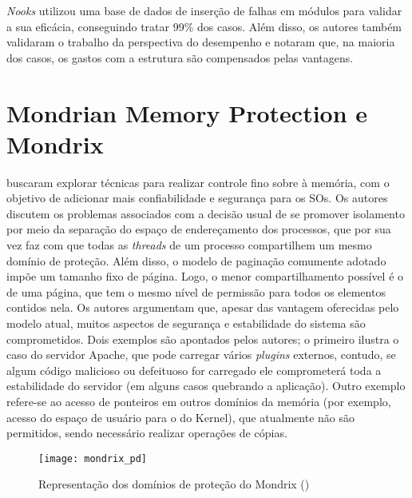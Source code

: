 \emph{Nooks} utilizou uma base de dados de inserção de falhas em módulos para
validar a sua eficácia, conseguindo tratar 99\% dos casos. Além disso, os
autores também validaram o trabalho da perspectiva do desempenho e notaram que,
na maioria dos casos, os gastos com a estrutura são compensados pelas vantagens.

\section{Mondrian Memory Protection e Mondrix}
\label{sec:mondrian}

\citet{mmp} buscaram explorar técnicas para realizar controle fino sobre à
memória, com o objetivo de adicionar mais confiabilidade e segurança para os
SOs. Os autores discutem os problemas associados com a decisão usual de se promover
isolamento por meio da separação do espaço de endereçamento dos processos, que
por sua vez faz com que todas as \emph{threads} de um processo compartilhem um
mesmo domínio de proteção. Além disso, o modelo de paginação comumente adotado impõe um
tamanho fixo de página. Logo, o menor compartilhamento possível é o de uma página, que
tem o mesmo nível de permissão para todos os elementos contidos nela. Os autores
argumentam que, apesar das vantagem oferecidas pelo modelo atual, muitos
aspectos de segurança e estabilidade do sistema são comprometidos. Dois
exemplos são apontados pelos autores; o primeiro ilustra o caso do servidor
Apache, que pode carregar vários \textit{plugins} externos, contudo, se algum
código malicioso ou defeituoso for carregado ele comprometerá toda a
estabilidade do servidor (em alguns casos quebrando a aplicação). Outro exemplo
refere-se ao acesso de ponteiros em outros domínios da memória (por exemplo,
acesso do espaço de usuário para o do Kernel), que atualmente não são permitidos,
sendo necessário realizar operações de cópias.

\begin{figure}[!h]
  \centering
  \texttt{[image: mondrix\_pd]}
	\caption[Representação dos domínios de proteção do Mondrix]{Representação dos domínios de proteção do Mondrix (\cite{mondrix})}
  \label{fig:mondrixPD} 
\end{figure}

